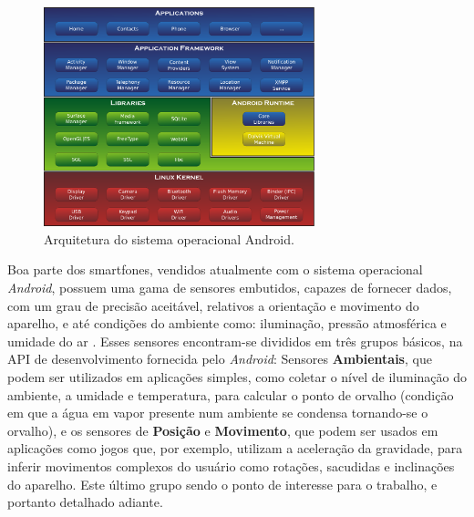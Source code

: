 \begin{figure}[H]
	\centering
		\includegraphics[width=0.7\textwidth]{figuras/android_sys_arch.pdf}
		\caption{Arquitetura do sistema operacional Android.}
		\label{fig:androidsysarch}
\end{figure}

Boa parte dos smartfones, vendidos atualmente com o sistema operacional \textit{Android}, possuem uma gama de sensores embutidos, capazes de fornecer dados, com um grau de precisão aceitável, relativos a orientação e movimento do aparelho, e até condições do ambiente como: iluminação, pressão atmosférica e umidade do ar . Esses sensores encontram-se divididos em três grupos básicos, na API de desenvolvimento fornecida pelo \textit{Android}: Sensores \textbf{Ambientais}, que podem ser utilizados em aplicações simples, como coletar o nível de iluminação do ambiente, a umidade e temperatura, para calcular o ponto de orvalho (condição em que a água em vapor presente num ambiente se condensa tornando-se o orvalho), e os sensores de \textbf{Posição} e \textbf{Movimento}, que podem ser usados em aplicações como jogos que, por exemplo, utilizam a aceleração da gravidade, para inferir movimentos complexos do usuário como rotações, sacudidas e inclinações do aparelho. Este último grupo sendo o ponto de interesse para o trabalho, e portanto detalhado adiante.\par

